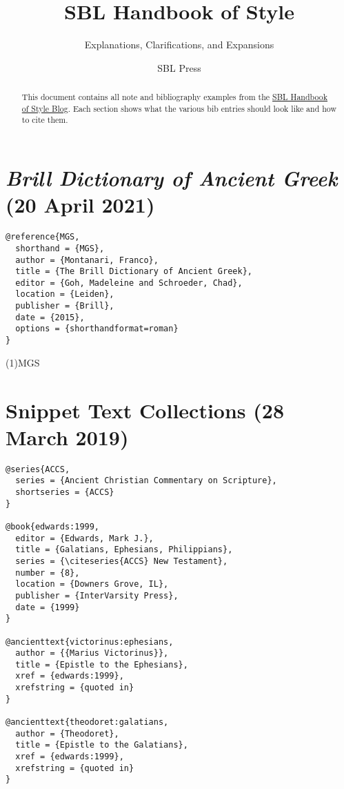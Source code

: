 \documentclass[a4paper]{article}
\begin{document}
\title{SBL Handbook of Style}
\author{Explanations, Clarifications, and Expansions}
\date{SBL Press}
\maketitle

\begin{abstract}
  This document contains all note and bibliography examples from the
  \href{https://sblhs2.com/}{SBL Handbook of Style Blog}. Each section shows
  what the various bib entries should look like and how to cite them.
\end{abstract}

\tableofcontents

\section{\emph{Brill Dictionary of Ancient Greek} (20 April 2021)}

\begin{verbatim}
@reference{MGS,
  shorthand = {MGS},
  author = {Montanari, Franco},
  title = {The Brill Dictionary of Ancient Greek},
  editor = {Goh, Madeleine and Schroeder, Chad},
  location = {Leiden},
  publisher = {Brill},
  date = {2015},
  options = {shorthandformat=roman}
}
\end{verbatim}

\examplecite(1){MGS}
\exampleabbreviations
{}

\section{Snippet Text Collections (28 March 2019)}

\begin{verbatim}
@series{ACCS,
  series = {Ancient Christian Commentary on Scripture},
  shortseries = {ACCS}
}

@book{edwards:1999,
  editor = {Edwards, Mark J.},
  title = {Galatians, Ephesians, Philippians},
  series = {\citeseries{ACCS} New Testament},
  number = {8},
  location = {Downers Grove, IL},
  publisher = {InterVarsity Press},
  date = {1999}
}

@ancienttext{victorinus:ephesians,
  author = {{Marius Victorinus}},
  title = {Epistle to the Ephesians},
  xref = {edwards:1999},
  xrefstring = {quoted in}
}

@ancienttext{theodoret:galatians,
  author = {Theodoret},
  title = {Epistle to the Galatians},
  xref = {edwards:1999},
  xrefstring = {quoted in}
}
\end{verbatim}
\end{document}
